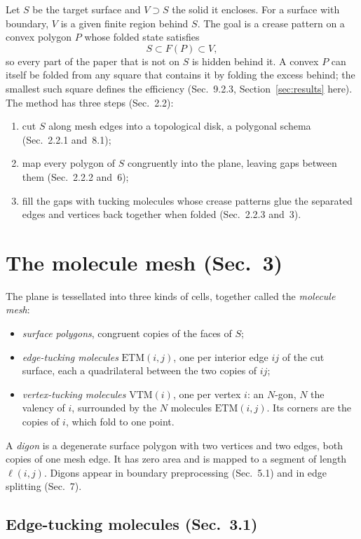 \documentclass[11pt]{article}
\theoremstyle{definition}
\newcommand{\ETM}{\mathrm{ETM}}
\newcommand{\VTM}{\mathrm{VTM}}
\begin{document}
Let $S$ be the target surface and $V \supset S$ the solid it encloses. For a
surface with boundary, $V$ is a given finite region behind $S$. The goal is a
crease pattern on a convex polygon $P$ whose folded state satisfies
\[
  S \subset F(P) \subset V ,
\]
so every part of the paper that is not on $S$ is hidden behind it. A convex $P$
can itself be folded from any square that contains it by folding the excess
behind; the smallest such square defines the efficiency (Sec.~9.2.3,
Section~\ref{sec:results} here). The method has three steps (Sec.~2.2):
\begin{enumerate}[nosep]
  \item cut $S$ along mesh edges into a topological disk, a polygonal schema
    (Sec.~2.2.1 and~8.1);
  \item map every polygon of $S$ congruently into the plane, leaving gaps
    between them (Sec.~2.2.2 and~6);
  \item fill the gaps with tucking molecules whose crease patterns glue the
    separated edges and vertices back together when folded (Sec.~2.2.3 and~3).
\end{enumerate}

\section{The molecule mesh (Sec.~3)}

The plane is tessellated into three kinds of cells, together called the
\emph{molecule mesh}:
\begin{itemize}[nosep]
  \item \emph{surface polygons}, congruent copies of the faces of $S$;
  \item \emph{edge-tucking molecules} $\ETM(i,j)$, one per interior edge $ij$
    of the cut surface, each a quadrilateral between the two copies of $ij$;
  \item \emph{vertex-tucking molecules} $\VTM(i)$, one per vertex $i$: an
    $N$-gon, $N$ the valency of $i$, surrounded by the $N$ molecules
    $\ETM(i,j)$. Its corners are the copies of $i$, which fold to one point.
\end{itemize}
A \emph{digon} is a degenerate surface polygon with two vertices and two edges,
both copies of one mesh edge. It has zero area and is mapped to a segment of
length $\ell(i,j)$. Digons appear in boundary preprocessing (Sec.~5.1) and in
edge splitting (Sec.~7).

\subsection{Edge-tucking molecules (Sec.~3.1)}
\end{document}
